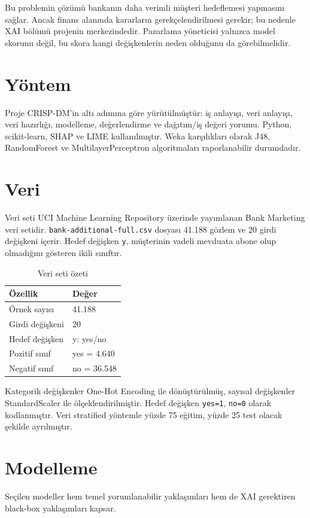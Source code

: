 \documentclass[11pt,a4paper]{article}
\begin{document}
Bu problemin çözümü bankanın daha verimli müşteri hedeflemesi yapmasını sağlar. Ancak finans alanında kararların gerekçelendirilmesi gerekir; bu nedenle XAI bölümü projenin merkezindedir. Pazarlama yöneticisi yalnızca model skorunu değil, bu skora hangi değişkenlerin neden olduğunu da görebilmelidir.

\section{Yöntem}
Proje CRISP-DM'in altı adımına göre yürütülmüştür: iş anlayışı, veri anlayışı, veri hazırlığı, modelleme, değerlendirme ve dağıtım/iş değeri yorumu. Python, scikit-learn, SHAP ve LIME kullanılmıştır. Weka karşılıkları olarak J48, RandomForest ve MultilayerPerceptron algoritmaları raporlanabilir durumdadır.

\section{Veri}
Veri seti UCI Machine Learning Repository üzerinde yayımlanan Bank Marketing veri setidir. \texttt{bank-additional-full.csv} dosyası 41.188 gözlem ve 20 girdi değişkeni içerir. Hedef değişken \texttt{y}, müşterinin vadeli mevduata abone olup olmadığını gösteren ikili sınıftır.

\begin{table}[h]
\centering
\begin{tabular}{ll}
\toprule
Özellik & Değer\\
\midrule
Örnek sayısı & 41.188\\
Girdi değişkeni & 20\\
Hedef değişken & y: yes/no\\
Pozitif sınıf & yes = 4.640\\
Negatif sınıf & no = 36.548\\
\bottomrule
\end{tabular}
\caption{Veri seti özeti}
\end{table}

Kategorik değişkenler One-Hot Encoding ile dönüştürülmüş, sayısal değişkenler StandardScaler ile ölçeklendirilmiştir. Hedef değişken \texttt{yes=1}, \texttt{no=0} olarak kodlanmıştır. Veri stratified yöntemle yüzde 75 eğitim, yüzde 25 test olacak şekilde ayrılmıştır.

\section{Modelleme}
Seçilen modeller hem temel yorumlanabilir yaklaşımları hem de XAI gerektiren black-box yaklaşımları kapsar.
\end{document}
